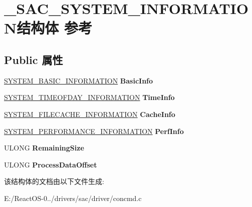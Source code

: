 \hypertarget{struct___s_a_c___s_y_s_t_e_m___i_n_f_o_r_m_a_t_i_o_n}{}\section{\+\_\+\+S\+A\+C\+\_\+\+S\+Y\+S\+T\+E\+M\+\_\+\+I\+N\+F\+O\+R\+M\+A\+T\+I\+O\+N结构体 参考}
\label{struct___s_a_c___s_y_s_t_e_m___i_n_f_o_r_m_a_t_i_o_n}
\subsection*{Public 属性}
\begin{DoxyCompactItemize}
\item 
\mbox{\label{struct___s_a_c___s_y_s_t_e_m___i_n_f_o_r_m_a_t_i_o_n_ace50015dd1eb173371acc050c0761d0e}} 
\hyperlink{struct___s_y_s_t_e_m___b_a_s_i_c___i_n_f_o_r_m_a_t_i_o_n}{S\+Y\+S\+T\+E\+M\+\_\+\+B\+A\+S\+I\+C\+\_\+\+I\+N\+F\+O\+R\+M\+A\+T\+I\+ON} {\bfseries Basic\+Info}
\item 
\mbox{\label{struct___s_a_c___s_y_s_t_e_m___i_n_f_o_r_m_a_t_i_o_n_a15f624c70e5351421f0336820491bbdb}} 
\hyperlink{struct___s_y_s_t_e_m___t_i_m_e_o_f_d_a_y___i_n_f_o_r_m_a_t_i_o_n}{S\+Y\+S\+T\+E\+M\+\_\+\+T\+I\+M\+E\+O\+F\+D\+A\+Y\+\_\+\+I\+N\+F\+O\+R\+M\+A\+T\+I\+ON} {\bfseries Time\+Info}
\item 
\mbox{\label{struct___s_a_c___s_y_s_t_e_m___i_n_f_o_r_m_a_t_i_o_n_a2b7dead3e40aabf6cdd922593294c5e5}} 
\hyperlink{struct___s_y_s_t_e_m___f_i_l_e_c_a_c_h_e___i_n_f_o_r_m_a_t_i_o_n}{S\+Y\+S\+T\+E\+M\+\_\+\+F\+I\+L\+E\+C\+A\+C\+H\+E\+\_\+\+I\+N\+F\+O\+R\+M\+A\+T\+I\+ON} {\bfseries Cache\+Info}
\item 
\mbox{\label{struct___s_a_c___s_y_s_t_e_m___i_n_f_o_r_m_a_t_i_o_n_a6a1a2c79acbc77d8e24b03146a56fc59}} 
\hyperlink{struct___s_y_s_t_e_m___p_e_r_f_o_r_m_a_n_c_e___i_n_f_o_r_m_a_t_i_o_n}{S\+Y\+S\+T\+E\+M\+\_\+\+P\+E\+R\+F\+O\+R\+M\+A\+N\+C\+E\+\_\+\+I\+N\+F\+O\+R\+M\+A\+T\+I\+ON} {\bfseries Perf\+Info}
\item 
\mbox{\label{struct___s_a_c___s_y_s_t_e_m___i_n_f_o_r_m_a_t_i_o_n_af0ca9bdbb829d39923c396ec3f1aeb45}} 
U\+L\+O\+NG {\bfseries Remaining\+Size}
\item 
\mbox{\label{struct___s_a_c___s_y_s_t_e_m___i_n_f_o_r_m_a_t_i_o_n_abf95c33ca9c1c031d8b5e205f5eb4347}} 
U\+L\+O\+NG {\bfseries Process\+Data\+Offset}
\end{DoxyCompactItemize}


该结构体的文档由以下文件生成\+:\begin{DoxyCompactItemize}
\item 
E\+:/\+React\+O\+S-\/0../drivers/sac/driver/concmd.\+c\end{DoxyCompactItemize}
